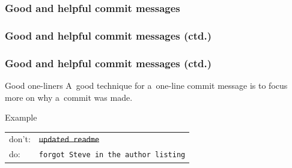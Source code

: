 \documentclass[12pt]{beamer}
\begin{document}
\begin{frame}
  \frametitle{Good and helpful commit messages}

\end{frame}

\begin{frame}
  \frametitle{Good and helpful commit messages (ctd.)}

\end{frame}

\begin{frame}
  \frametitle{Good and helpful commit messages (ctd.)}

  \begin{block}{Good one-liners}
    A~good technique for a~one-line commit message is to focus more on
    \alert{why} a~commit was made.\\
  \end{block}

  \begin{block}{Example}
    \begin{tabular}{@{}ll@{}}
      don't: & \sout{\texttt{updated readme}} \\
      do:    & \texttt{forgot Steve in the author listing} \\
    \end{tabular}
  \end{block}
\end{frame}
\end{document}
